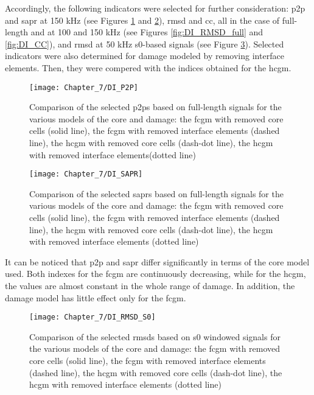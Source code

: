 \documentclass[11pt,a4paper,final]{report}
\theoremstyle{plain}
\begin{document}
Accordingly, the following indicators were selected for further consideration: \ac{p2p} and \ac{sapr} at 150 \unit{kHz} (see Figures \ref{fig:DI_P2P} and \ref{fig:DI_SAPR}), \ac{rmsd} and \ac{cc}, all in the case of full-length and at 100 and 150 \unit{\kHz} (see Figures \ref{fig:DI_RMSD_full} and \ref{fig:DI_CC}), and \ac{rmsd} at 50 \unit{kHz} \ac{s0}-based signals (see Figure \ref{fig:DI_RMSD_S0}).
Selected indicators were also determined for damage modeled by removing interface elements. Then, they were compered with the indices obtained for the \ac{hcgm}.

\begin{figure}[!tbh]
	\begin{center}
		\texttt{[image: Chapter\_7/DI\_P2P]}
	\end{center}
	\caption{Comparison of the selected \acfp{p2p} based on full-length signals for the various models of the core and damage: the \acf{fcgm} with removed core cells (solid line), the \acf{fcgm} with removed interface elements (dashed line), the \acf{hcgm} with removed core cells (dash-dot line), the \acf{hcgm} with removed interface elements(dotted line)}
	\label{fig:DI_P2P}
\end{figure}

\begin{figure}[!tbh]
	\begin{center}
		\texttt{[image: Chapter\_7/DI\_SAPR]}
	\end{center}
	\caption{Comparison of the selected \acfp{sapr} based on full-length signals for the various models of the core and damage: the \acf{fcgm} with removed core cells (solid line), the \acf{fcgm} with removed interface elements (dashed line), the \acf{hcgm} with removed core cells (dash-dot line), the \acf{hcgm} with removed interface elements (dotted line)}
	\label{fig:DI_SAPR}
\end{figure}
It can be noticed that \ac{p2p} and \ac{sapr} differ significantly in terms of the core model used. Both indexes for the \ac{fcgm} are continuously decreasing, while for the \ac{hcgm}, the values are almost constant in the whole range of damage.
In addition, the damage model has little effect only for the \ac{fcgm}.

\begin{figure}[!tbh]
	\begin{center}
		\texttt{[image: Chapter\_7/DI\_RMSD\_S0]}
	\end{center}
	\caption{Comparison of the selected \acfp{rmsd} based on \ac{s0} windowed signals for the various models of the core and damage: the \acf{fcgm} with removed core cells (solid line), the \acf{fcgm} with removed interface elements (dashed line), the \acf{hcgm} with removed core cells (dash-dot line), the \acf{hcgm} with removed interface elements (dotted line)}
	\label{fig:DI_RMSD_S0}
\end{figure}
\end{document}
